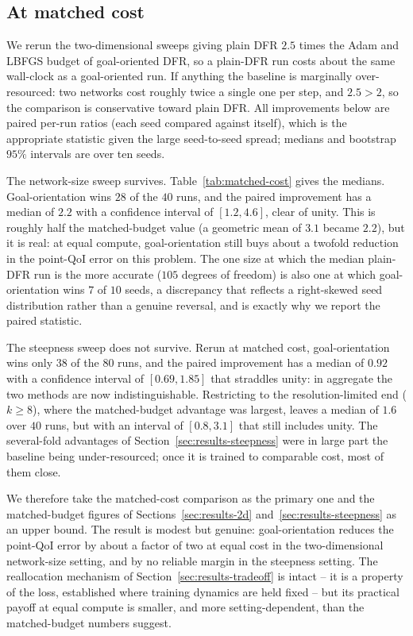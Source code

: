 \documentclass[preprint,11pt]{elsarticle}
\begin{document}
\subsection{At matched cost}
\label{sec:results-matched-cost}

We rerun the two-dimensional sweeps giving plain DFR $2.5$ times the Adam and LBFGS budget of goal-oriented DFR, so a plain-DFR run costs about the same wall-clock as a goal-oriented run. If anything the baseline is marginally over-resourced: two networks cost roughly twice a single one per step, and $2.5 > 2$, so the comparison is conservative toward plain DFR. All improvements below are paired per-run ratios (each seed compared against itself), which is the appropriate statistic given the large seed-to-seed spread; medians and bootstrap $95\%$ intervals are over ten seeds.

The network-size sweep survives. Table~\ref{tab:matched-cost} gives the medians. Goal-orientation wins $28$ of the $40$ runs, and the paired improvement has a median of $2.2$ with a confidence interval of $[1.2, 4.6]$, clear of unity. This is roughly half the matched-budget value (a geometric mean of $3.1$ became $2.2$), but it is real: at equal compute, goal-orientation still buys about a twofold reduction in the point-QoI error on this problem. The one size at which the median plain-DFR run is the more accurate ($105$ degrees of freedom) is also one at which goal-orientation wins $7$ of $10$ seeds, a discrepancy that reflects a right-skewed seed distribution rather than a genuine reversal, and is exactly why we report the paired statistic.

The steepness sweep does not survive. Rerun at matched cost, goal-orientation wins only $38$ of the $80$ runs, and the paired improvement has a median of $0.92$ with a confidence interval of $[0.69, 1.85]$ that straddles unity: in aggregate the two methods are now indistinguishable. Restricting to the resolution-limited end ($k \geq 8$), where the matched-budget advantage was largest, leaves a median of $1.6$ over $40$ runs, but with an interval of $[0.8, 3.1]$ that still includes unity. The several-fold advantages of Section~\ref{sec:results-steepness} were in large part the baseline being under-resourced; once it is trained to comparable cost, most of them close.

We therefore take the matched-cost comparison as the primary one and the matched-budget figures of Sections~\ref{sec:results-2d} and~\ref{sec:results-steepness} as an upper bound. The result is modest but genuine: goal-orientation reduces the point-QoI error by about a factor of two at equal cost in the two-dimensional network-size setting, and by no reliable margin in the steepness setting. The reallocation mechanism of Section~\ref{sec:results-tradeoff} is intact -- it is a property of the loss, established where training dynamics are held fixed -- but its practical payoff at equal compute is smaller, and more setting-dependent, than the matched-budget numbers suggest.
\end{document}
